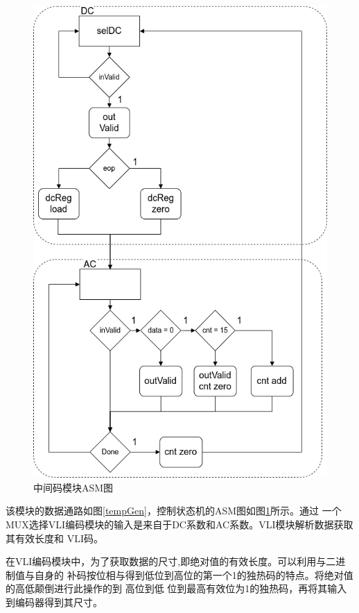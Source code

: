 \documentclass{article}
\numberwithin {equation}{section}
\begin{document}
\begin{spacing}{1.25}
      \begin{figure}[H]
        \centering
        \includegraphics[scale=0.4]{./pictures/tmepCodeASm.png}
        \caption{中间码模块ASM图}
        \label{tempGenASM}
      \end{figure}

      该模块的数据通路如图\ref{tempGen}，控制状态机的ASM图如图\ref{tempGenASM}所示。通过
      一个MUX选择VLI编码模块的输入是来自于DC系数和AC系数。VLI模块解析数据获取其有效长度和
      VLI码。

      在VLI编码模块中，为了获取数据的尺寸,即绝对值的有效长度。可以利用与二进制值与自身的
      补码按位相与得到低位到高位的第一个1的独热码的特点。将绝对值的高低颠倒进行此操作的到
      高位到低 位到最高有效位为1的独热码，再将其输入到编码器得到其尺寸。
      

\end{spacing}
\end{document}

